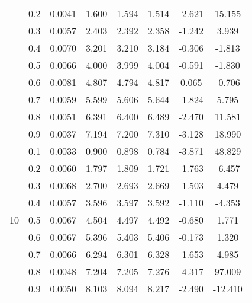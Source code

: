 \documentclass[11pt,a4paper]{report}
\begin{document}
\begin{longtable}{ | c | c || c | c | c | c | c | c | }
 & 0.2 & 0.0041 & 1.600 & 1.594 & 1.514 & -2.621 & 15.155 \\
 & 0.3 & 0.0057 & 2.403 & 2.392 & 2.358 & -1.242 & 3.939 \\
 & 0.4 & 0.0070 & 3.201 & 3.210 & 3.184 & -0.306 & -1.813 \\
 & 0.5 & 0.0066 & 4.000 & 3.999 & 4.004 & -0.591 & -1.830 \\
 & 0.6 & 0.0081 & 4.807 & 4.794 & 4.817 & 0.065 & -0.706 \\
 & 0.7 & 0.0059 & 5.599 & 5.606 & 5.644 & -1.824 & 5.795 \\
 & 0.8 & 0.0051 & 6.391 & 6.400 & 6.489 & -2.470 & 11.581 \\
 & 0.9 & 0.0037 & 7.194 & 7.200 & 7.310 & -3.128 & 18.990 \\
 \hline
\multirow{9}{*}{10} & 0.1 & 0.0033 & 0.900 & 0.898 & 0.784 & -3.871 & 48.829 \\
 & 0.2 & 0.0060 & 1.797 & 1.809 & 1.721 & -1.763 & -6.457 \\
 & 0.3 & 0.0068 & 2.700 & 2.693 & 2.669 & -1.503 & 4.479 \\
 & 0.4 & 0.0057 & 3.596 & 3.597 & 3.592 & -1.110 & -4.353 \\
 & 0.5 & 0.0067 & 4.504 & 4.497 & 4.492 & -0.680 & 1.771 \\
 & 0.6 & 0.0067 & 5.396 & 5.403 & 5.406 & -0.173 & 1.320 \\
 & 0.7 & 0.0066 & 6.294 & 6.301 & 6.328 & -1.653 & 4.985 \\
 & 0.8 & 0.0048 & 7.204 & 7.205 & 7.276 & -4.317 & 97.009 \\
 & 0.9 & 0.0050 & 8.103 & 8.094 & 8.217 & -2.490 & -12.410 \\
 \hline
\hline
\end{longtable}
\end{document}
